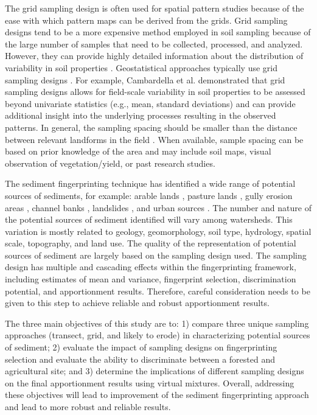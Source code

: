 \documentclass[
  number]{elsarticle}
\begin{document}
The grid sampling design is often used for spatial pattern studies
because of the ease with which pattern maps can be derived from the
grids. Grid sampling designs tend to be a more expensive method employed
in soil sampling because of the large number of samples that need to be
collected, processed, and analyzed. However, they can provide highly
detailed information about the distribution of variability in soil
properties \citep{pennock2008}. Geostatistical approaches typically use
grid sampling designs \citep{pennock2008}. For example, Cambardella et
al. \citep{cambardella1994} demonstrated that grid sampling designs
allows for field-scale variability in soil properties to be assessed
beyond univariate statistics (e.g., mean, standard deviations) and can
provide additional insight into the underlying processes resulting in
the observed patterns. In general, the sampling spacing should be
smaller than the distance between relevant landforms in the field
\citep{pennock2008}. When available, sample spacing can be based on
prior knowledge of the area and may include soil maps, visual
observation of vegetation/yield, or past research studies.

The sediment fingerprinting technique has identified a wide range of
potential sources of sediments, for example: arable lands
\citep[e.g.,][]{russell2001}, pasture lands \citep[e.g.,][]{blake2012},
gully erosion areas \citep[e.g.,][]{evrard2013}, channel banks
\citep[e.g.,][]{collins2010}, landslides \citep[e.g.,][]{nelson2002},
and urban sources \citep[e.g.,][]{carter2003}. The number and nature of
the potential sources of sediment identified will vary among watersheds.
This variation is mostly related to geology, geomorphology, soil type,
hydrology, spatial scale, topography, and land use. The quality of the
representation of potential sources of sediment are largely based on the
sampling design used. The sampling design has multiple and cascading
effects within the fingerprinting framework, including estimates of mean
and variance, fingerprint selection, discrimination potential, and
apportionment results. Therefore, careful consideration needs to be
given to this step to achieve reliable and robust apportionment results.

The three main objectives of this study are to: 1) compare three unique
sampling approaches (transect, grid, and likely to erode) in
characterizing potential sources of sediment; 2) evaluate the impact of
sampling designs on fingerprinting selection and evaluate the ability to
discriminate between a forested and agricultural site; and 3) determine
the implications of different sampling designs on the final
apportionment results using virtual mixtures. Overall, addressing these
objectives will lead to improvement of the sediment fingerprinting
approach and lead to more robust and reliable results.
\end{document}
